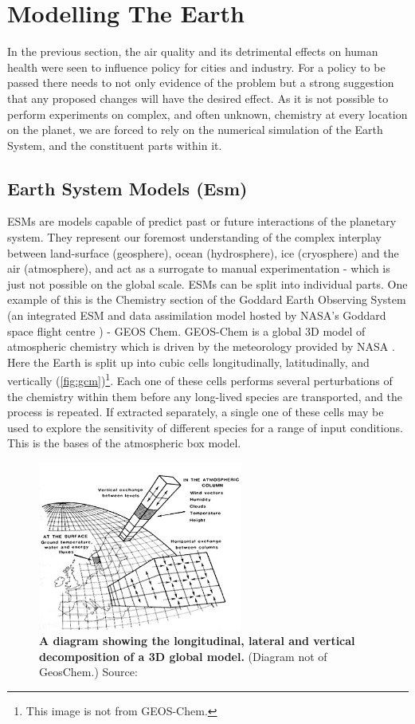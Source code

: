 
\section{Modelling The Earth}
In the previous section, the air quality and its detrimental effects on human health were seen to influence policy for cities and industry.
For a policy to be passed there needs to not only evidence of the problem but a strong suggestion that any proposed changes will have the desired effect. As it is not possible to perform experiments on complex, and often unknown, chemistry at every location on the planet, we are forced to rely on the numerical simulation of the Earth System, and the constituent parts within it.
\subsection{Earth System Models (Esm)}
  ESMs are models capable of predict past or future interactions of the planetary system. They represent our foremost understanding of the complex interplay between land-surface (geosphere), ocean (hydrosphere), ice (cryosphere) and the air (atmosphere), and act as a surrogate to manual experimentation -  which is just not possible on the global scale.
ESMs can be split into individual parts. One example of this is the Chemistry section of the Goddard Earth Observing System (an integrated ESM and data assimilation model hosted by NASA's Goddard space flight centre \citep{geosgit}) - GEOS Chem. GEOS-Chem is a global 3D model of atmospheric chemistry which is driven by the meteorology provided by NASA \citep{geos}. Here the Earth is split up into cubic cells longitudinally, latitudinally, and vertically (\autoref{fig:gcm})\footnote{This image is not from GEOS-Chem.}. Each one of these cells performs several perturbations of the chemistry within them before any long-lived species are transported, and the process is repeated. If extracted separately, a single one of these cells may be used to explore the sensitivity of different species for a range of input conditions. This is the bases of the atmospheric box model.
\begin{figure}
  \centering
  \includegraphics[width=0.6\textwidth]{gcm.jpg}
  \caption{\textbf{A diagram showing the longitudinal, lateral and vertical decomposition of a 3D global model.} (Diagram not of GeosChem.) Source: \citep{gcm}}
  \label{fig:gcm}
\end{figure}
